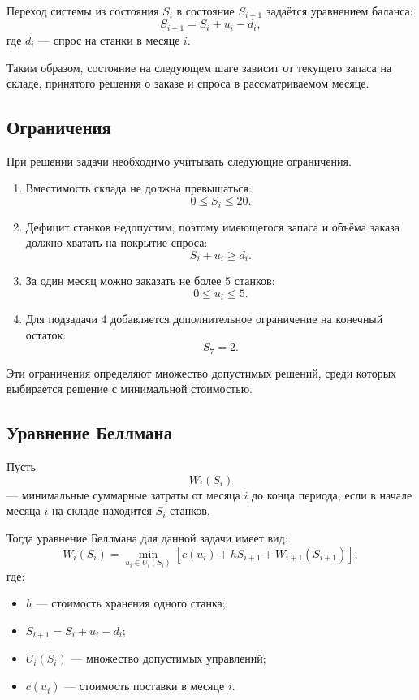 \documentclass[a4paper,12pt]{article}
\begin{document}
Переход системы из состояния $S_i$ в состояние $S_{i+1}$ задаётся уравнением баланса:
\[
S_{i+1} = S_i + u_i - d_i,
\]
где $d_i$ --- спрос на станки в месяце $i$.

Таким образом, состояние на следующем шаге зависит от текущего запаса на складе, принятого решения о заказе и спроса в рассматриваемом месяце.

\subsection{Ограничения}
При решении задачи необходимо учитывать следующие ограничения.

\begin{enumerate}
    \item Вместимость склада не должна превышаться:
    \[
    0 \le S_i \le 20.
    \]

    \item Дефицит станков недопустим, поэтому имеющегося запаса и объёма заказа должно хватать на покрытие спроса:
    \[
    S_i + u_i \ge d_i.
    \]

    \item За один месяц можно заказать не более 5 станков:
    \[
    0 \le u_i \le 5.
    \]

    \item Для подзадачи 4 добавляется дополнительное ограничение на конечный остаток:
    \[
    S_7 = 2.
    \]
\end{enumerate}

Эти ограничения определяют множество допустимых решений, среди которых выбирается решение с минимальной стоимостью.
\subsection{Уравнение Беллмана}
Пусть
\[
W_i(S_i)
\]
--- минимальные суммарные затраты от месяца $i$ до конца периода, если в начале месяца $i$ на складе находится $S_i$ станков.

Тогда уравнение Беллмана для данной задачи имеет вид:
\[
W_i(S_i)=
\min_{u_i \in U_i(S_i)}
\left[
c(u_i) + h S_{i+1} + W_{i+1}(S_{i+1})
\right],
\]
где:
\begin{itemize}
    \item $h$ --- стоимость хранения одного станка;
    \item $S_{i+1} = S_i + u_i - d_i$;
    \item $U_i(S_i)$ --- множество допустимых управлений;
    \item $c(u_i)$ --- стоимость поставки в месяце $i$.
\end{itemize}
\end{document}
